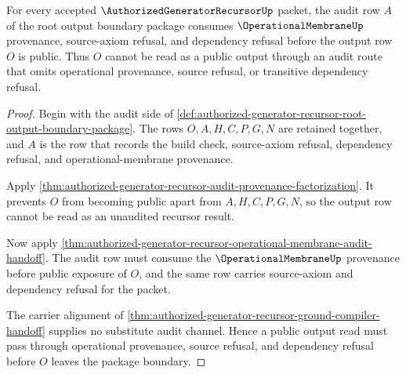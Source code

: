 \begin{theorem}
\label{thm:authorized-generator-recursor-root-audit-membrane-source-refusal}
For every accepted $\AuthorizedGeneratorRecursorUp$ packet, the audit row $A$ of the root output boundary package consumes $\OperationalMembraneUp$ provenance, source-axiom refusal, and dependency refusal before the output row $O$ is public. Thus $O$ cannot be read as a public output through an audit route that omits operational provenance, source refusal, or transitive dependency refusal.
\end{theorem}
\begin{proof}
Begin with the audit side of \autoref{def:authorized-generator-recursor-root-output-boundary-package}. The rows $O,A,H,C,P,G,N$ are retained together, and $A$ is the row that records the build check, source-axiom refusal, dependency refusal, and operational-membrane provenance.

Apply \autoref{thm:authorized-generator-recursor-audit-provenance-factorization}. It prevents $O$ from becoming public apart from $A,H,C,P,G,N$, so the output row cannot be read as an unaudited recursor result.

Now apply \autoref{thm:authorized-generator-recursor-operational-membrane-audit-handoff}. The audit row must consume the $\OperationalMembraneUp$ provenance before public exposure of $O$, and the same row carries source-axiom and dependency refusal for the packet.

The carrier alignment of \autoref{thm:authorized-generator-recursor-ground-compiler-handoff} supplies no substitute audit channel. Hence a public output read must pass through operational provenance, source refusal, and dependency refusal before $O$ leaves the package boundary.
\end{proof}

